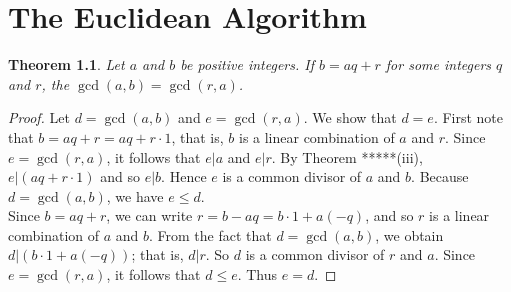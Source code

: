 \documentclass[10pt]{report}
\newtheorem{thm1}{Theorem}[chapter]
\begin{document}
\chapter{The Euclidean Algorithm}
\begin{thm1}
Let $a$ and $b$ be positive integers. If $b=aq+r$ for some integers $q$ and $r$, the $\gcd(a,b)=\gcd(r,a)$.
\end{thm1}
\begin{proof}
Let $d=\gcd(a,b)$ and $e=\gcd(r,a)$. We show that $d=e$. First note that $b=aq+r=aq+r\cdot 1$, that is, $b$ is a linear combination of $a$ and $r$. Since $e=\gcd(r,a)$, it follows that $e|a$ and $e|r$. By Theorem *****(iii), $e|(aq+r\cdot 1)$ and so $e|b$. Hence $e$ is a common divisor of $a$ and $b$. Because $d=\gcd(a,b)$, we have $e\leq d$.\\
Since $b=aq+r$, we can write $r=b-aq=b\cdot 1+a(-q)$, and so $r$ is a linear combination of $a$ and $b$. From the fact that $d=\gcd(a,b)$, we obtain $d|(b\cdot 1+a(-q))$; that is, $d|r$. So $d$ is a common divisor of $r$ and $a$. Since $e=\gcd(r,a)$, it follows that $d\leq e$. Thus $e=d$.
\end{proof}
\end{document}
